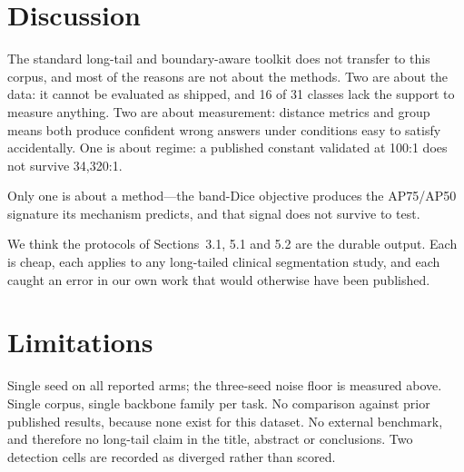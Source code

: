 \documentclass[10pt,twocolumn,letterpaper]{article}
\begin{document}
\section{Discussion}

The standard long-tail and boundary-aware toolkit does not transfer to this
corpus, and most of the reasons are not about the methods. Two are about the
data: it cannot be evaluated as shipped, and 16 of 31 classes lack the support
to measure anything. Two are about measurement: distance metrics and group means
both produce confident wrong answers under conditions easy to satisfy
accidentally. One is about regime: a published constant validated at 100:1 does
not survive 34{,}320:1.

Only one is about a method---the band-Dice objective produces the AP75/AP50
signature its mechanism predicts, and that signal does not survive to test.

We think the protocols of Sections~3.1, 5.1 and 5.2 are the durable output. Each
is cheap, each applies to any long-tailed clinical segmentation study, and each
caught an error in our own work that would otherwise have been published.

\section{Limitations}

Single seed on all reported arms; the three-seed noise floor is measured above. Single corpus, single backbone family per task. No comparison
against prior published results, because none exist for this dataset. No
external benchmark, and therefore no long-tail claim in the title, abstract or
conclusions. Two detection cells are recorded as diverged rather than scored.

{\small


}
\end{document}
